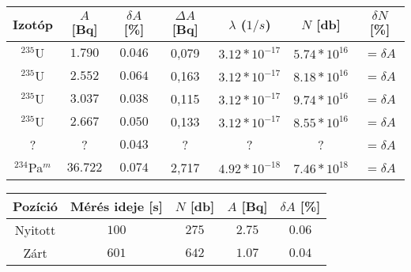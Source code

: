 \begin{center}
\begin{tabular}{|c|c|c|c|c|c|c|}
\hline
Izotóp 			 & $A$ [Bq] & $\delta A$ [\%] & $\Delta A$ [Bq] & $\lambda$ ($1/s$)   & $N$ [db]         & $\delta N$ [\%] \\
\hline
$^{235}$U 		 & $1.790$  & $0.046$ 		  & 0,079          & $3.12 * 10^{-17}$   & $5.74 * 10^{16}$ & $=\delta A$ \\
$^{235}$U 		 & $2.552$  & $0.064$ 		  & 0,163          & $3.12 * 10^{-17}$   & $8.18 * 10^{16}$ & $=\delta A$ \\
$^{235}$U 		 & $3.037$  & $0.038$ 		  & 0,115          & $3.12 * 10^{-17}$   & $9.74 * 10^{16}$ & $=\delta A$ \\
$^{235}$U        & $2.667$  & $0.050$ 		  & 0,133          & $3.12 * 10^{-17}$   & $8.55 * 10^{16}$ & $=\delta A$ \\
?                & ?        & $0.043$         & ?              & ?                   & ?                & $=\delta A$ \\
$^{234}$Pa$^{m}$ & $36.722$ & $0.074$ 		  & 2,717          & $4.92 * 10^{-18}$   & $7.46 * 10^{18}$ & $=\delta A$ \\
\hline
\end{tabular}
 \label{table:4}
\end{center}

\begin{center}
\begin{tabular}{|c|c|c|c|c|}
\hline
Pozíció & Mérés ideje [s]   & $N$ [db]   & $A$ [Bq]   & $\delta A$ [\%] \\
\hline
Nyitott & $100$             & $275$      & $2.75$     & $0.06$ \\
\hline
Zárt    & $601$             & $642$      & $1.07$     & $0.04$ \\
\hline
\end{tabular}
 \label{table:5}
\end{center}